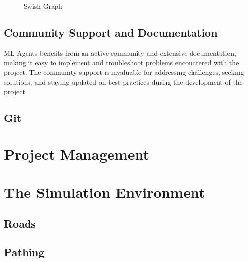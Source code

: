 \documentclass{article}
\begin{document}
\begin{figure}[h]
    \centering
    \caption{Swish Graph}
\end{figure}


\subsection{Community Support and Documentation}
ML-Agents benefits from an active community and extensive documentation, making it easy to implement and troubleshoot problems encountered with the project. The community support is invaluable for addressing challenges, seeking solutions, and staying updated on best practices during the development of the project.

\subsection{Git}
\lipsum[2][1]

\section{Project Management}
\lipsum[2][1]

\section{The Simulation Environment}
\lipsum[2][1]

\subsection{Roads}
\lipsum[2][1]

\subsection{Pathing}
\lipsum[2][1]
\end{document}
